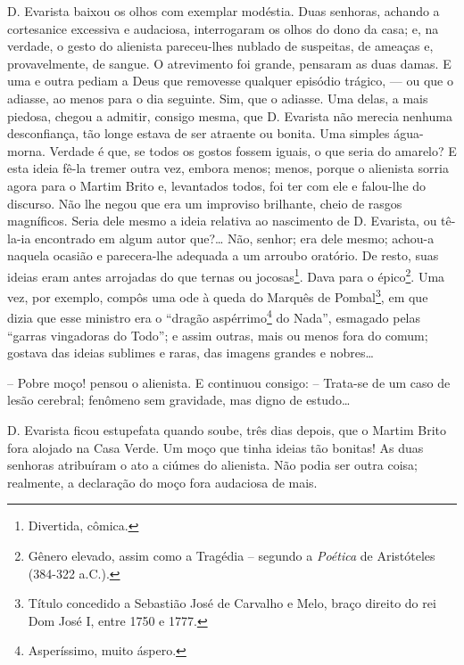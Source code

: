 D. Evarista baixou os olhos com exemplar modéstia. Duas senhoras,
achando a cortesanice excessiva e audaciosa, interrogaram os olhos do
dono da casa; e, na verdade, o gesto do alienista pareceu-lhes nublado
de suspeitas, de ameaças e, provavelmente, de sangue. O atrevimento foi
grande, pensaram as duas damas. E uma e outra pediam a Deus que
removesse qualquer episódio trágico, --- ou que o adiasse, ao menos para
o dia seguinte. Sim, que o adiasse. Uma delas, a mais piedosa, chegou a
admitir, consigo mesma, que D. Evarista não merecia nenhuma
desconfiança, tão longe estava de ser atraente ou bonita. Uma simples
água-morna. Verdade é que, se todos os gostos fossem iguais, o que seria
do amarelo? E esta ideia fê-la tremer outra vez, embora menos; menos,
porque o alienista sorria agora para o Martim Brito e, levantados todos,
foi ter com ele e falou-lhe do discurso. Não lhe negou que era um
improviso brilhante, cheio de rasgos magníficos. Seria dele mesmo a
ideia relativa ao nascimento de D. Evarista, ou tê-la-ia encontrado em
algum autor que?\ldots{} Não, senhor; era dele mesmo; achou-a naquela
ocasião e parecera-lhe adequada a um arroubo oratório. De resto, suas
ideias eram antes arrojadas do que ternas ou jocosas\footnote{Divertida,
  cômica.}. Dava para o épico\footnote{Gênero elevado, assim como a
  Tragédia -- segundo a \emph{Poética} de Aristóteles (384-322 a.C.).}.
Uma vez, por exemplo, compôs uma ode à queda do Marquês de
Pombal\footnote{Título concedido a Sebastião José de Carvalho e Melo,
  braço direito do rei Dom José I, entre 1750 e 1777.}, em que dizia que
esse ministro era o ``dragão aspérrimo\footnote{Asperíssimo, muito
  áspero.} do Nada'', esmagado pelas ``garras vingadoras do Todo''; e
assim outras, mais ou menos fora do comum; gostava das ideias sublimes e
raras, das imagens grandes e nobres\ldots{}

-- Pobre moço! pensou o alienista. E continuou consigo: -- Trata-se de
um caso de lesão cerebral; fenômeno sem gravidade, mas digno de
estudo\ldots{}

D. Evarista ficou estupefata quando soube, três dias depois, que o
Martim Brito fora alojado na Casa Verde. Um moço que tinha ideias tão
bonitas! As duas senhoras atribuíram o ato a ciúmes do alienista. Não
podia ser outra coisa; realmente, a declaração do moço fora audaciosa de
mais.

